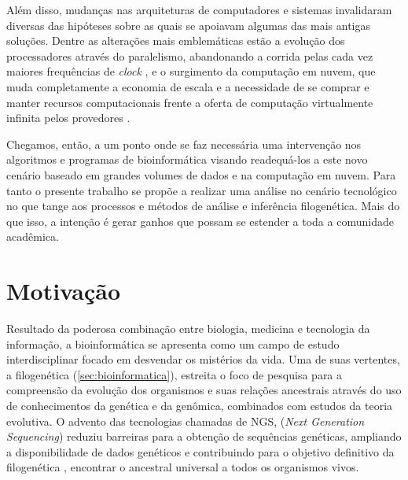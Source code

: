 \documentclass[english,brazilian]{UNISINOSmonografia} %
\begin{document}


Além disso, mudanças nas arquiteturas de computadores e sistemas invalidaram diversas das hipóteses sobre as quais se apoiavam algumas das mais antigas soluções.
Dentre as alterações mais emblemáticas estão a evolução dos processadores através do paralelismo, abandonando a corrida pelas cada vez maiores frequências de \textit{clock} \cite{Baker1999}, e o surgimento da computação em nuvem, que muda completamente a economia de escala e a necessidade de se comprar e manter recursos computacionais frente a oferta de computação virtualmente infinita pelos provedores \cite{NIST}.


Chegamos, então, a um ponto onde se faz necessária uma intervenção nos algoritmos e programas de bioinformática visando readequá-los a este novo cenário baseado em grandes volumes de dados e na computação em nuvem.
Para tanto o presente trabalho se propõe a realizar uma análise no cenário tecnológico no que tange aos processos e métodos de análise e inferência filogenética.
Mais do que isso, a intenção é gerar ganhos que possam se estender a toda a comunidade acadêmica.



\section{Motivação}



Resultado da poderosa combinação entre biologia, medicina e tecnologia da informação, a bioinformática se apresenta como um campo de estudo interdisciplinar focado em desvendar os mistérios da vida.
Uma de suas vertentes, a filogenética (\autoref{sec:bioinformatica}), estreita o foco de pesquisa para a compreensão da evolução dos organismos e suas relações ancestrais através do uso de conhecimentos da genética e da genômica, combinados com estudos da teoria evolutiva.
O advento das tecnologias chamadas de NGS, (\textit{Next Generation Sequencing}) reduziu barreiras para a obtenção de sequências genéticas, ampliando a disponibilidade de dados genéticos e contribuindo para o objetivo definitivo da filogenética \cite{book:2119998,yang2014molecular}, encontrar o ancestral universal a todos os organismos vivos.


\end{document}
